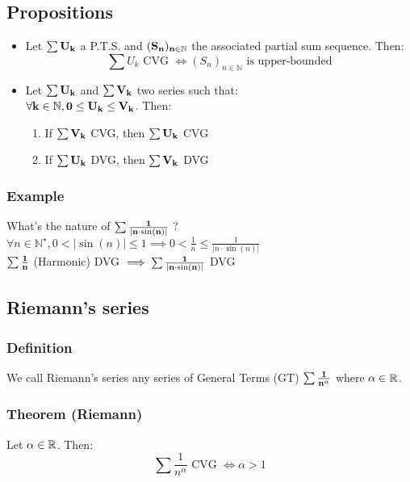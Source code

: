 \documentclass[notitlepage]{math}
\begin{document}
\subsection{Propositions}
\begin{itemize}
    \item Let $\bf \sum U_k$ a P.T.S. and $\bf (S_n)_{n \in \mathbb{N}}$ the associated partial sum sequence. Then:
    \[ \sum U_k \text{ CVG } \Leftrightarrow (S_n)_{n \in \mathbb{N}} \text{ is upper-bounded} \]
    \item Let $\bf \sum U_k$ and $\bf \sum V_k$ two series such that: \\
    $\bf \forall k \in \mathbb{N}, 0 \leq U_k \leq V_k$. Then:
    \begin{enumerate}
        \item If $\bf \sum V_k$ CVG, then $\bf \sum U_k$ CVG
        \item If $\bf \sum U_k$ DVG, then $\bf \sum V_k$ DVG
    \end{enumerate}
\end{itemize}
\subsubsection{Example}
What's the nature of $\bf \sum \frac{1}{\lvert n \cdot \sin(n) \rvert}$ ?\\

\noindent $\forall n \in \mathbb{N}^\star, 0 < \lvert \sin(n) \rvert \leq 1 \implies 0 < \frac{1}{n} \leq \frac{1}{\lvert n \cdot \sin(n) \rvert}$\\
$\bf \sum \frac{1}{n}$ (Harmonic) DVG $\implies \bf \sum \frac{1}{\lvert n \cdot \sin(n) \rvert}$ DVG

\subsection{Riemann's series}
\subsubsection{Definition}
We call Riemann's series any series of General Terms (GT) $\bf \sum \frac{1}{n^\alpha}$ where $\bf \alpha \in \mathbb{R}$.\\
\subsubsection{Theorem (Riemann)}
Let $\bf \alpha \in \mathbb{R}$. Then:
\[ \sum \frac{1}{n^\alpha} \text{ CVG } \Longleftrightarrow \alpha > 1 \]
\end{document}

